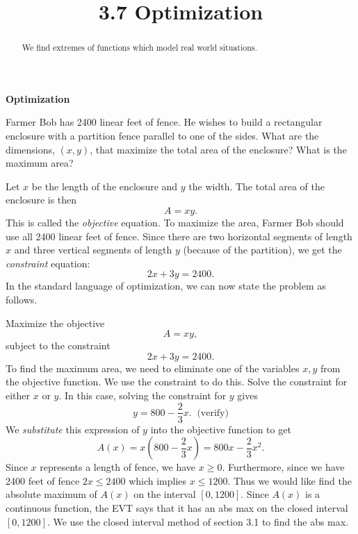 \documentclass[handout]{ximera}
\title{3.7 Optimization}
\begin{document}
\begin{abstract}
We find extremes of functions which model real world situations.
\end{abstract}

\maketitle

\begin{center}
\textbf{Optimization}
\end{center}
 

\begin{example}[example 1]
Farmer Bob has 2400 linear feet of fence. He wishes to build a rectangular enclosure with a partition fence parallel to one of the sides.  
What are the dimensions, $(x,y)$, that maximize the total area of the enclosure? What is the maximum area?


\begin{image}
\end{image}
Let $x$ be the length of the enclosure and $y$ the width.  The total area of the enclosure is then
\[A= xy.\]
This is called the {\it objective} equation.
To maximize the area, Farmer Bob should use all 2400 linear feet of fence.  Since there are two horizontal segments of length $x$ and three vertical segments of length $y$ (because of the partition), we get the {\it constraint} equation:
\[2x+3y=2400.\]
In the standard language of optimization, we can now state the problem as follows.

Maximize the objective
\[A = xy,\]
subject to the constraint 
\[2x+3y = 2400.\]
To find the maximum area, we need to eliminate one of the variables $x, y$ from the objective function.
We use the constraint to do this.  Solve the constraint for either $x$ or $y$.
In this case, solving the constraint for $y$ gives
\[y = 800 - \frac23 x. \;\; \text{(verify)}\]
We {\it substitute} this expression of $y$ into the objective function to get 
\[A(x) = x\left(800 - \frac23 x\right) = 800x - \frac23 x^2.\]
Since $x$ represents a length of fence, we have $x \geq 0$. Furthermore, since we have 2400 feet of fence $2x \leq 2400$ which implies $x\leq 1200$.
Thus we would like find the absolute maximum of $A(x)$ on the interval $[0, 1200]$. Since $A(x)$ is a continuous function, the EVT says that it has an abs max on the closed interval $[0, 1200]$.  We use the closed interval method of section 3.1 to find the abs max.


\end{example}
\end{document}
